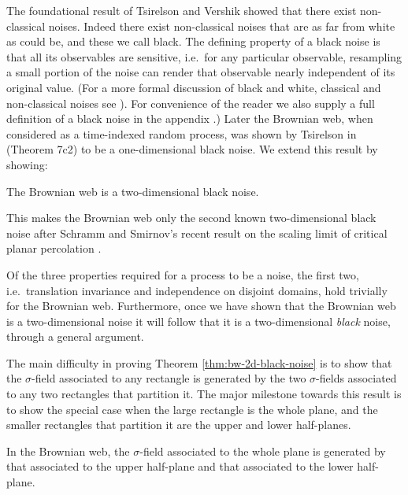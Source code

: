 {The foundational result of Tsirelson and Vershik \cite{tsirelson-vershik} showed that there
exist non-classical noises.  Indeed there exist non-classical noises
that are as far from white as could be, and these we call black.  The
defining property of a black noise is that all its observables are
sensitive, i.e.\ for any particular observable, resampling a small portion of the noise can
render that observable nearly independent of its original
value.  (For a more formal discussion of black and white, classical
and non-classical noises see \cite{tsirelson-nonclassical-stochastic-flows}).  For convenience of the reader
we also supply a full definition of a black noise in
the appendix .)  Later the Brownian web,
when considered as a time-indexed random process,
was shown by Tsirelson in
\cite{tsirelson-scaling-limit-noise-stability} (Theorem 7c2)
to be a one-dimensional black noise.  We
extend this
result by showing:

\begin{theorem}
\label{thm:bw-2d-black-noise}
The Brownian web is a
two-dimensional black noise.
\end{theorem}

This makes the Brownian web only the second
known two-dimensional black noise after Schramm and Smirnov's
recent result on the scaling limit of critical planar
percolation \cite{schramm-smirnov}.

Of the three properties required for a process to be a noise, the
first two, i.e.\ translation invariance and independence on disjoint
domains, hold trivially for the Brownian web.  Furthermore, once we
have shown that the Brownian web is a two-dimensional noise it will
follow that it is a two-dimensional \emph{black} noise,
through a general argument.

The main difficulty in proving
Theorem \ref{thm:bw-2d-black-noise} is to show that the $\sigma$-field
associated to any rectangle is generated by the two $\sigma$-fields
associated to any two rectangles that partition it.
The major milestone towards this result is to show the special case
when the large rectangle is the whole plane, and the smaller
rectangles that partition it are the upper and lower half-planes.

\begin{theorem}
\label{thm:informal-recovering-from-half-planes}
In the Brownian web, the $\sigma$-field associated to the whole plane
is generated by that associated to the upper half-plane and that
associated to the lower half-plane.
\end{theorem}

}
